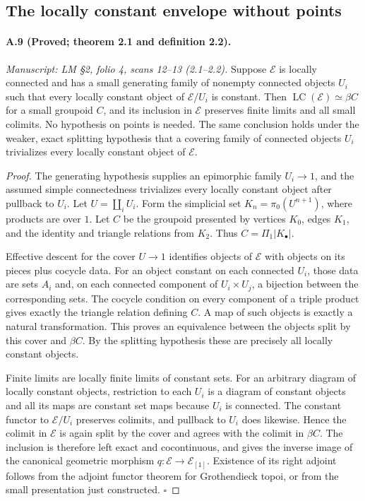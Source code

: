 \subsection{The locally constant envelope without points}

\paragraph{A.9 (Proved; theorem 2.1 and definition 2.2).}
\textit{Manuscript: LM \S2, folio 4, scans 12--13 (2.1--2.2).}
Suppose $\mathcal E$ is locally connected and has a small generating family of nonempty connected objects $U_i$ such that every locally constant object of $\mathcal E/U_i$ is constant. Then $\operatorname{LC}(\mathcal E)\simeq\beta C$ for a small groupoid $C$, and its inclusion in $\mathcal E$ preserves finite limits and all small colimits. No hypothesis on points is needed. The same conclusion holds under the weaker, exact splitting hypothesis that a covering family of connected objects $U_i$ trivializes every locally constant object of $\mathcal E$.
\begin{proof}
The generating hypothesis supplies an epimorphic family $U_i\to1$, and the assumed simple connectedness trivializes every locally constant object after pullback to $U_i$. Let $U=\coprod_iU_i$. Form the simplicial set $K_n=\pi_0(U^{n+1})$, where products are over $1$. Let $C$ be the groupoid presented by vertices $K_0$, edges $K_1$, and the identity and triangle relations from $K_2$. Thus $C=\Pi_1|K_\bullet|$.

Effective descent for the cover $U\to1$ identifies objects of $\mathcal E$ with objects on its pieces plus cocycle data. For an object constant on each connected $U_i$, those data are sets $A_i$ and, on each connected component of $U_i\times U_j$, a bijection between the corresponding sets. The cocycle condition on every component of a triple product gives exactly the triangle relation defining $C$. A map of such objects is exactly a natural transformation. This proves an equivalence between the objects split by this cover and $\beta C$. By the splitting hypothesis these are precisely all locally constant objects.

Finite limits are locally finite limits of constant sets. For an arbitrary diagram of locally constant objects, restriction to each $U_i$ is a diagram of constant objects and all its maps are constant set maps because $U_i$ is connected. The constant functor to $\mathcal E/U_i$ preserves colimits, and pullback to $U_i$ does likewise. Hence the colimit in $\mathcal E$ is again split by the cover and agrees with the colimit in $\beta C$. The inclusion is therefore left exact and cocontinuous, and gives the inverse image of the canonical geometric morphism $q:\mathcal E\to\mathcal E_{[1]}$. Existence of its right adjoint follows from the adjoint functor theorem for Grothendieck topoi, or from the small presentation just constructed. \hfill$\square$
\end{proof}

